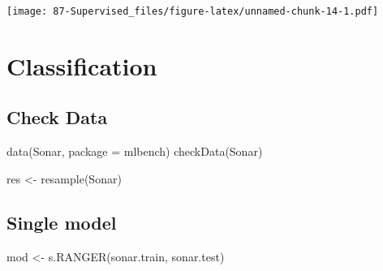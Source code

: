 \documentclass[
]{book}
\newenvironment{Shaded}{\begin{snugshade}}{\end{snugshade}}
\newcommand{\AttributeTok}[1]{\textcolor[rgb]{0.77,0.63,0.00}{#1}}
\newcommand{\FunctionTok}[1]{\textcolor[rgb]{0.00,0.00,0.00}{#1}}
\newcommand{\NormalTok}[1]{#1}
\newcommand{\OtherTok}[1]{\textcolor[rgb]{0.56,0.35,0.01}{#1}}
\newcommand{\SpecialCharTok}[1]{\textcolor[rgb]{0.00,0.00,0.00}{#1}}
\newcommand{\StringTok}[1]{\textcolor[rgb]{0.31,0.60,0.02}{#1}}
\begin{document}
\texttt{[image: 87-Supervised\_files/figure-latex/unnamed-chunk-14-1.pdf]}

\hypertarget{classification}{%
\section{Classification}\label{classification}}

\hypertarget{check-data}{%
\subsection{Check Data}\label{check-data}}

\begin{Shaded}
\begin{Highlighting}[]
\FunctionTok{data}\NormalTok{(Sonar, }\AttributeTok{package =} \StringTok{\textquotesingle{}mlbench\textquotesingle{}}\NormalTok{)}
\FunctionTok{checkData}\NormalTok{(Sonar)}
\end{Highlighting}
\end{Shaded}

\begin{Shaded}
\begin{Highlighting}[]
\NormalTok{res }\OtherTok{\textless{}{-}} \FunctionTok{resample}\NormalTok{(Sonar)}
\end{Highlighting}
\end{Shaded}

\begin{Shaded}
\end{Shaded}

\hypertarget{single-model-1}{%
\subsection{Single model}\label{single-model-1}}

\begin{Shaded}
\begin{Highlighting}[]
\NormalTok{mod }\OtherTok{\textless{}{-}} \FunctionTok{s.RANGER}\NormalTok{(sonar.train, sonar.test)}
\end{Highlighting}
\end{Shaded}
\end{document}
